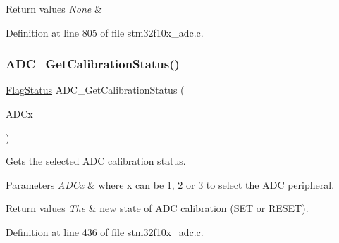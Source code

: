 \begin{DoxyRetVals}{Return values}
{\em None} & \\
\hline
\end{DoxyRetVals}


Definition at line 805 of file stm32f10x\+\_\+adc.\+c.

\mbox{\label{group___a_d_c___private___functions_ga7a728f699b487c7fa1694d7424967122}} 
\subsubsection{\texorpdfstring{A\+D\+C\+\_\+\+Get\+Calibration\+Status()}{ADC\_GetCalibrationStatus()}}
{\footnotesize\ttfamily \hyperlink{group___exported__types_ga89136caac2e14c55151f527ac02daaff}{Flag\+Status} A\+D\+C\+\_\+\+Get\+Calibration\+Status (\begin{DoxyParamCaption}\item[{\hyperlink{struct_a_d_c___type_def}{A\+D\+C\+\_\+\+Type\+Def} $\ast$}]{A\+D\+Cx }\end{DoxyParamCaption})}



Gets the selected A\+DC calibration status. 


\begin{DoxyParams}{Parameters}
{\em A\+D\+Cx} & where x can be 1, 2 or 3 to select the A\+DC peripheral. \\
\hline
\end{DoxyParams}

\begin{DoxyRetVals}{Return values}
{\em The} & new state of A\+DC calibration (S\+ET or R\+E\+S\+ET). \\
\hline
\end{DoxyRetVals}


Definition at line 436 of file stm32f10x\+\_\+adc.\+c.

\mbox{\label{group___a_d_c___private___functions_gaaf74221c285ec5dab5e66baf7bec6bd3}} 
